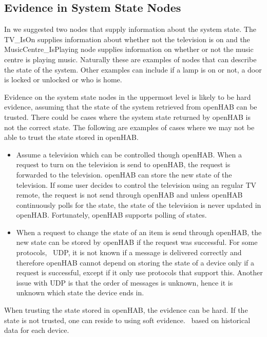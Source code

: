 \subsection{Evidence in System State Nodes}
\label{sec:design:bayesian-network:system-state-nodes-evidence}

In  we suggested two nodes that supply information about the system state. The TV\_IsOn supplies information about whether not the television is on and the MusicCentre\_IsPlaying node supplies information on whether or not the music centre is playing music. Naturally these are examples of nodes that can describe the state of the system. Other examples can include if a lamp is on or not, a door is locked or unlocked or who is home.

Evidence on the system state nodes in the uppermost level is likely to be hard evidence, assuming that the state of the system retrieved from openHAB can be trusted. There could be cases where the system state returned by openHAB is not the correct state. The following are examples of cases where we may not be able to trust the state stored in openHAB.

\begin{itemize}
\item Assume a television which can be controlled though openHAB. When a request to turn on the television is send to openHAB, the request is forwarded to the television. openHAB can store the new state of the television. If some user decides to control the television using an regular TV remote, the request is not send through openHAB and unless openHAB continuously polls for the state, the state of the television is never updated in openHAB. Fortunately, openHAB supports polling of states.
\item When a request to change the state of an item is send through openHAB, the new state can be stored by openHAB if the request was successful. For some protocols, \eg~UDP, it is not known if a message is delivered correctly and therefore openHAB cannot depend on storing the state of a device only if a request is successful, except if it only use protocols that support this. Another issue with UDP is that the order of messages is unknown, hence it is unknown which state the device ends in.
\end{itemize}

When trusting the state stored in openHAB, the evidence can be hard. If the state is not trusted, one can reside to using soft evidence. \eg~based on historical data for each device.

